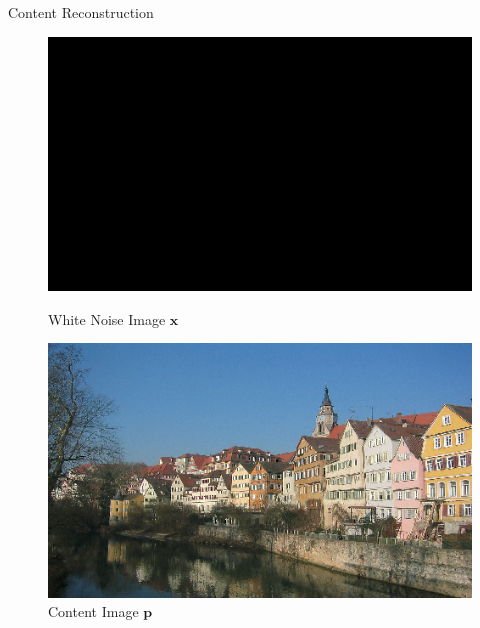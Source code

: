 \documentclass{beamer}
\begin{document}
\begin{frame}{Content Reconstruction}
\begin{figure}[ht]
    \begin{minipage}[b]{0.45\linewidth}
        \centering
        \includegraphics[width=\textwidth]{img/content/noise}
        \caption*{White Noise Image $\mathbf{x}$}
    \end{minipage}
    \hspace{0.5cm}
    \begin{minipage}[b]{0.45\linewidth}
        \centering
        \includegraphics[width=\textwidth]{img/content/tubingen}
        \caption*{Content Image $\mathbf{p}$}
    \end{minipage}
\end{figure}
\end{frame}
\end{document}
